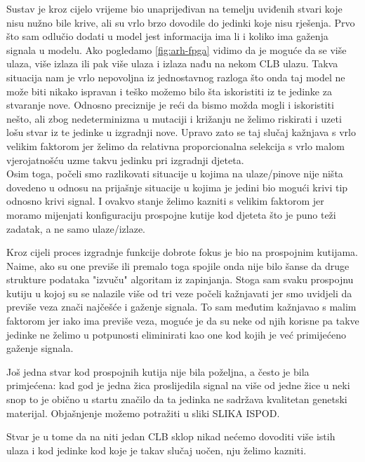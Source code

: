 \documentclass[times, utf8, zavrsni]{fer}
\begin{document}
Sustav je kroz cijelo vrijeme bio unaprijeđivan na temelju uviđenih stvari koje nisu nužno bile krive, ali su vrlo brzo dovodile do jedinki koje nisu rješenja. Prvo što sam odlučio dodati u model jest informacija ima li i koliko ima gaženja signala u modelu. Ako pogledamo \ref{fig:arh-fpga} vidimo da je moguće da se više ulaza, više izlaza ili pak više ulaza i izlaza nađu na nekom CLB ulazu. Takva situacija nam je vrlo nepovoljna iz jednostavnog razloga što onda taj model ne može biti nikako ispravan i teško možemo bilo šta iskoristiti iz te jedinke za stvaranje nove. Odnosno preciznije je reći da bismo možda mogli i iskoristiti nešto, ali zbog nedeterminizma u mutaciji i križanju ne želimo riskirati i uzeti lošu stvar iz te jedinke u izgradnji nove. Upravo zato se taj slučaj kažnjava s vrlo velikim faktorom jer želimo da relativna proporcionalna selekcija s vrlo malom vjerojatnošću uzme takvu jedinku pri izgradnji djeteta. \\ 
Osim toga, počeli smo razlikovati situacije u kojima na ulaze/pinove nije ništa dovedeno u odnosu na prijašnje situacije u kojima je jedini bio mogući krivi tip odnosno krivi signal. I ovakvo stanje želimo kazniti s velikim faktorom jer moramo mijenjati konfiguraciju prospojne kutije kod djeteta što je puno teži zadatak, a ne samo ulaze/izlaze. 


Kroz cijeli proces izgradnje funkcije dobrote fokus je bio na prospojnim kutijama. Naime, ako su one previše ili premalo toga spojile onda nije bilo šanse da druge strukture podataka "izvuču" algoritam iz zapinjanja. Stoga sam svaku prospojnu kutiju u kojoj su se nalazile više od tri veze počeli kažnjavati jer smo uvidjeli da previše veza znači najčešće i gaženje signala. To sam međutim kažnjavao s malim faktorom jer iako ima previše veza, moguće je da su neke od njih korisne pa takve jedinke ne želimo u potpunosti eliminirati kao one kod kojih je već primijećeno gaženje signala. 


Još jedna stvar kod prospojnih kutija nije bila poželjna, a često je bila primjećena: kad god je jedna žica proslijedila signal na više od jedne žice u neki snop to je obično u startu značilo da ta jedinka ne sadržava kvalitetan genetski materijal. Objašnjenje možemo potražiti u sliki SLIKA ISPOD.




Stvar je u tome da na niti jedan CLB sklop nikad nećemo dovoditi više istih ulaza i kod jedinke kod koje je takav slučaj uočen, nju želimo kazniti. 
\end{document}
